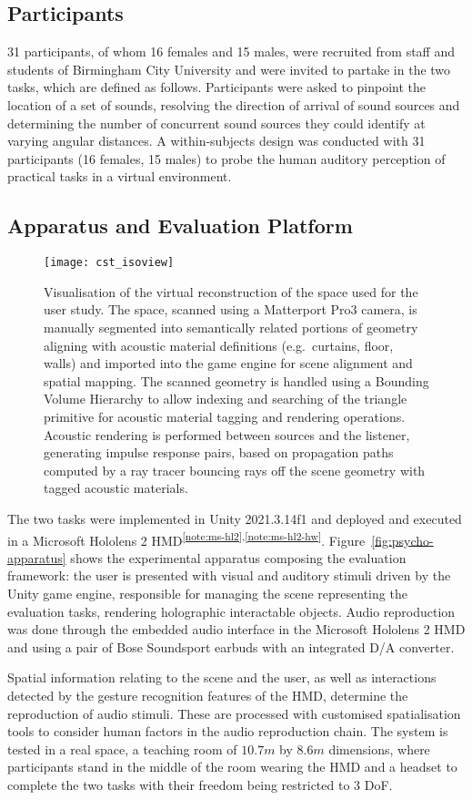 \subsection{Participants}
31 participants, of whom 16 females and 15 males, were recruited from staff and students of Birmingham City University and were invited to partake in the two tasks, which are defined as follows. Participants were asked to pinpoint the location of a set of sounds, resolving the direction of arrival of sound sources and determining the number of concurrent sound sources they could identify at varying angular distances. A within-subjects design was conducted with 31 participants (16 females, 15 males) to probe the human auditory perception of practical tasks in a virtual environment.

\subsection{Apparatus and Evaluation Platform}
\begin{figure}[htbp]%
    \centering
    \texttt{[image: cst\_isoview]}
    \caption[Virtual reconstruction of the physical space used for psychoacoustic testing]{Visualisation of the virtual reconstruction of the space used for the user study. The space, scanned using a Matterport Pro3 camera, is manually segmented into semantically related portions of geometry aligning with acoustic material definitions (e.g.\ curtains, floor, walls) and imported into the game engine for scene alignment and spatial mapping. The scanned geometry is handled using a Bounding Volume Hierarchy to allow indexing and searching of the triangle primitive for acoustic material tagging and rendering operations. Acoustic rendering is performed between sources and the listener, generating impulse response pairs, based on propagation paths computed by a ray tracer bouncing rays off the scene geometry with tagged acoustic materials.}\label{fig:cst-mesh}
\end{figure}
The two tasks were implemented in Unity 2021.3.14f1 and deployed and executed in a Microsoft Hololens 2 HMD\textsuperscript{\ref{note:ms-hl2},\ref{note:ms-hl2-hw}}. Figure~\ref{fig:psycho-apparatus} shows the experimental apparatus composing the evaluation framework: the user is presented with visual and auditory stimuli driven by the Unity game engine, responsible for managing the scene representing the evaluation tasks, rendering holographic interactable objects. Audio reproduction was done through the embedded audio interface in the Microsoft Hololens 2 HMD and using a pair of Bose Soundsport earbuds with an integrated D/A converter.\par
Spatial information relating to the scene and the user, as well as interactions detected by the gesture recognition features of the HMD, determine the reproduction of audio stimuli. These are processed with customised spatialisation tools to consider human factors in the audio reproduction chain. The system is tested in a real space, a teaching room of $10.7m$ by $8.6m$ dimensions, where participants stand in the middle of the room wearing the HMD and a headset to complete the two tasks with their freedom being restricted to 3 DoF.\par

